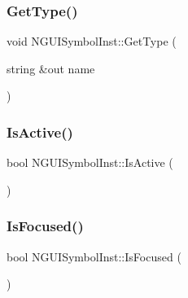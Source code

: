 \hypertarget{class_n_g_u_i_symbol_inst_a7bc04fdbdca9986d8561eac22d99ebd4}{}\label{class_n_g_u_i_symbol_inst_a7bc04fdbdca9986d8561eac22d99ebd4} 
\subsubsection{\texorpdfstring{Get\+Type()}{GetType()}}
{\footnotesize\ttfamily void N\+G\+U\+I\+Symbol\+Inst\+::\+Get\+Type (\begin{DoxyParamCaption}\item[{string \&out}]{name }\end{DoxyParamCaption})}

\hypertarget{class_n_g_u_i_symbol_inst_af99bcee9710a5379faefa4fb55117020}{}\label{class_n_g_u_i_symbol_inst_af99bcee9710a5379faefa4fb55117020} 
\subsubsection{\texorpdfstring{Is\+Active()}{IsActive()}}
{\footnotesize\ttfamily bool N\+G\+U\+I\+Symbol\+Inst\+::\+Is\+Active (\begin{DoxyParamCaption}{ }\end{DoxyParamCaption})}

\hypertarget{class_n_g_u_i_symbol_inst_abf70a2daceb80c378bd2dbe5fc09f168}{}\label{class_n_g_u_i_symbol_inst_abf70a2daceb80c378bd2dbe5fc09f168} 
\subsubsection{\texorpdfstring{Is\+Focused()}{IsFocused()}}
{\footnotesize\ttfamily bool N\+G\+U\+I\+Symbol\+Inst\+::\+Is\+Focused (\begin{DoxyParamCaption}{ }\end{DoxyParamCaption})}

\hypertarget{class_n_g_u_i_symbol_inst_a7f5e5472748640985037ba5b8db08ea9}{}\label{class_n_g_u_i_symbol_inst_a7f5e5472748640985037ba5b8db08ea9} 
